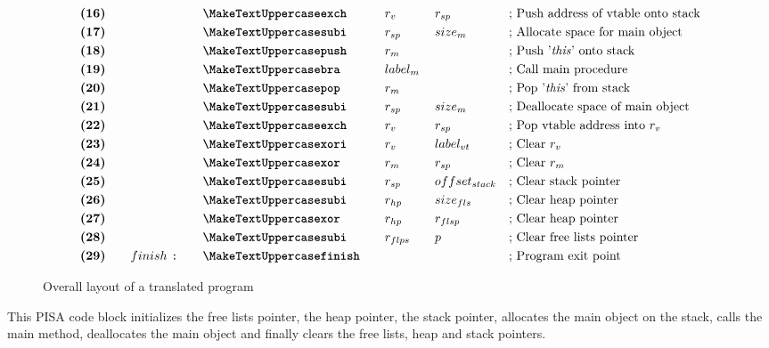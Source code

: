 \begin{figure}[h]
{\begin{minipage}{\linewidth}
\begin{alignat*}{6}
    &\textbf{(16)}\quad&& &&\inst{exch}\quad &&r_v\quad &&r_{sp}\qquad &&\text{; Push address of vtable onto    stack}\\
    &\textbf{(17)}\quad&& &&\inst{subi}\quad &&r_{sp}\quad &&size_m\qquad &&\text{; Allocate space for main     object}\\
    &\textbf{(18)}\quad&& &&\inst{push}\quad &&r_m\quad && &&\text{; Push '\textit{this}' onto stack}\\
    &\textbf{(19)}\quad&& &&\inst{bra}\quad &&label_m \span\omit\span \qquad&&\text{; Call main procedure}\\
    &\textbf{(20)}\quad&& &&\inst{pop}\quad &&r_m\quad && &&\text{; Pop '\textit{this}' from stack}\\
    &\textbf{(21)}\quad&& &&\inst{subi}\quad &&r_{sp}\quad &&size_m\qquad &&\text{; Deallocate space of main    object}\\
    &\textbf{(22)}\quad&& &&\inst{exch}\quad &&r_v\quad &&r_{sp}\qquad &&\text{; Pop vtable address into $r_v$}\\
    &\textbf{(23)}\quad&& &&\inst{xori}\quad &&r_v\quad &&label_{vt}\qquad &&\text{; Clear $r_v$}\\
    &\textbf{(24)}\quad&& &&\inst{xor}\quad &&r_m\quad &&r_{sp}\qquad &&\text{; Clear $r_m$}\\
    &\textbf{(25)}\quad&& &&\inst{subi}\quad &&r_{sp}\quad &&offset_{stack} &&\text{; Clear stack pointer}\\
    &\textbf{(26)}\quad&& &&\inst{subi}\quad &&r_{hp}\quad &&size_{fls} &&\text{; Clear heap pointer}\\
    &\textbf{(27)}\quad&& &&\inst{xor}\quad &&r_{hp}\quad &&r_{flsp} &&\text{; Clear heap pointer}\\
    &\textbf{(28)}\quad&& &&\inst{subi}\quad &&r_{flps}\quad &&p &&\text{; Clear free lists pointer}\\
    &\textbf{(29)}\quad&&finish\ \texttt{:}\quad&&\inst{finish}\quad && && &&\text{; Program exit point}
    \end{alignat*}
    \end{minipage}
    }
    \caption{Overall layout of a translated \rooplpp program}
    \label{fig:pisa-program-layout}
\end{figure}

This PISA code block initializes the free lists pointer, the heap pointer, the stack pointer, allocates the main object on the stack, calls the main method, deallocates the main object and finally clears the free lists, heap and stack pointers.

